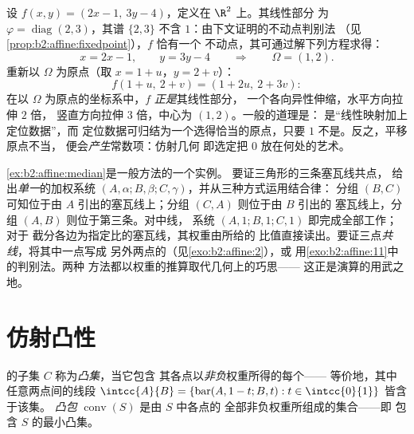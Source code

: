 \begin{example}[仿射映射的分类：从头
到尾]\label{ex:b2:affine:dilation}
设 $f(x, y) = (2x - 1,\ 3y - 4)$，定义在 $\R^2$ 上。其线性部分
为 $\varphi = \operatorname{diag}(2, 3)$，其谱
$\{2, 3\}$ 不含 $1$：由下文证明的不动点判别法
（见\cref{prop:b2:affine:fixedpoint}），$f$ 恰有一个
不动点，其可通过解下列方程求得：
\[
x = 2x - 1, \qquad y = 3y - 4
\qquad\Longrightarrow\qquad \Omega = (1, 2).
\]
重新以 $\Omega$ 为原点（取 $x = 1 + u$，$y = 2 + v$）：
\[
f(1 + u,\ 2 + v) = (1 + 2u,\ 2 + 3v) :
\]
在以 $\Omega$ 为原点的坐标系中，$f$ \emph{正是}其线性部分，
一个各向异性伸缩，水平方向拉伸 $2$ 倍，
竖直方向拉伸 $3$ 倍，中心为 $(1, 2)$。一般的道理是：
是“线性映射加上定位数据”，而
定位数据可归结为一个选得恰当的原点，只要
$1$ 不是。反之，平移原点不当，
便会\emph{产生}常数项：仿射几何
即选定把 $0$ 放在何处的艺术。
\end{example}

\begin{remark}
\cref{ex:b2:affine:median}是一般方法的一个实例。
要证三角形的三条塞瓦线共点，
给出\emph{单一}的加权系统 $(A,
\alpha; B, \beta; C, \gamma)$，并从三种方式运用结合律：
分组 $(B, C)$ 可知位于由
$A$ 引出的塞瓦线上；分组 $(C, A)$ 则位于由 $B$ 引出的
塞瓦线上，分组 $(A, B)$ 则位于第三条。对中线，
系统 $(A, 1; B, 1; C, 1)$ 即完成全部工作；对于
截分各边为指定比的塞瓦线，其权重由所给的
比值直接读出。要证三点\emph{共线}，将其中一点写成
另外两点的（见\cref{exo:b2:affine:2}），或
用\cref{exo:b2:affine:11}中的判别法。两种
方法都以权重的推算取代几何上的巧思——
这正是演算的用武之地。
\end{remark}

\section{仿射凸性}

\begin{definition}\label{def:b2:affine:convex}
的子集 $C$ 称为\emph{凸集}，当它包含
其各点以\emph{非负}权重所得的每个——
等价地，其中任意两点间的线段 $\intcc{A}{B} = \{\operatorname{bar}(A,
1-t; B, t) : t \in \intcc{0}{1}\}$ 皆含于该集。
\emph{凸包} $\operatorname{conv}(S)$ 是由 $S$ 中各点的
全部非负权重所组成的集合——即
包含 $S$ 的最小凸集。
\end{definition}

